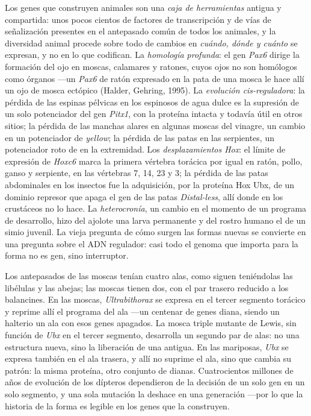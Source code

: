 \begin{definition}\label{def:b3:developmental-genetics:evodevo}
Los genes que construyen animales son una \emph{caja de herramientas}
antigua y compartida: unos pocos cientos de factores de transcripción y
de vías de señalización presentes en el antepasado común de todos los
animales, y la diversidad animal procede sobre todo de cambios en
\emph{cuándo, dónde y cuánto} se expresan, y no en lo que codifican. La
\emph{homología profunda}: el gen \emph{Pax6} dirige la formación del
ojo en moscas, calamares y ratones, cuyos ojos no son homólogos como
órganos ---un \emph{Pax6} de ratón expresado en la pata de una mosca le
hace allí un ojo de mosca ectópico (Halder, Gehring, 1995). La
\emph{evolución cis-reguladora}: la pérdida de las espinas pélvicas en
los espinosos de agua dulce es la supresión de un solo potenciador del
gen \emph{Pitx1}, con la proteína intacta y todavía útil en otros
sitios; la pérdida de las manchas alares en algunas moscas del vinagre,
un cambio en un potenciador de \emph{yellow}; la pérdida de las patas
en las serpientes, un potenciador roto de \emph{} en la
extremidad. Los \emph{desplazamientos Hox}: el límite de expresión de
\emph{Hoxc6} marca la primera vértebra torácica por igual en ratón,
pollo, ganso y serpiente, en las vértebras 7, 14, 23 y 3; la pérdida de
las patas abdominales en los insectos fue la adquisición, por la
proteína Hox Ubx, de un dominio represor que apaga el gen de las patas
\emph{Distal-less}, allí donde en los crustáceos no lo hace. La
\emph{heterocronía}, un cambio en el momento de un programa de
desarrollo, hizo del ajolote una larva permanente y del rostro humano
el de un simio juvenil. La vieja pregunta de cómo surgen las formas
nuevas se convierte en una pregunta sobre el ADN regulador: casi todo
el genoma que importa para la forma no es gen, sino interruptor.
\end{definition}

\begin{example}\label{ex:b3:developmental-genetics:four-wings}
Los antepasados de las moscas tenían cuatro alas, como siguen
teniéndolas las libélulas y las abejas; las moscas tienen dos, con el
par trasero reducido a los balancines. En las moscas,
\emph{Ultrabithorax} se expresa en el tercer segmento torácico y
reprime allí el programa del ala ---un centenar de genes diana, siendo
un halterio un ala con esos genes apagados. La mosca triple mutante de
Lewis, sin función de \emph{Ubx} en el tercer segmento, desarrolla un
segundo par de alas: no una estructura nueva, sino la liberación de una
antigua. En las mariposas, \emph{Ubx} se expresa también en el ala
trasera, y allí no suprime el ala, sino que cambia su patrón: la misma
proteína, otro conjunto de dianas. Cuatrocientos millones de años de
evolución de los dípteros dependieron de la decisión de un solo gen en
un solo segmento, y una sola mutación la deshace en una generación
---por lo que la historia de la forma es legible en los genes que la
construyen.
\end{example}

